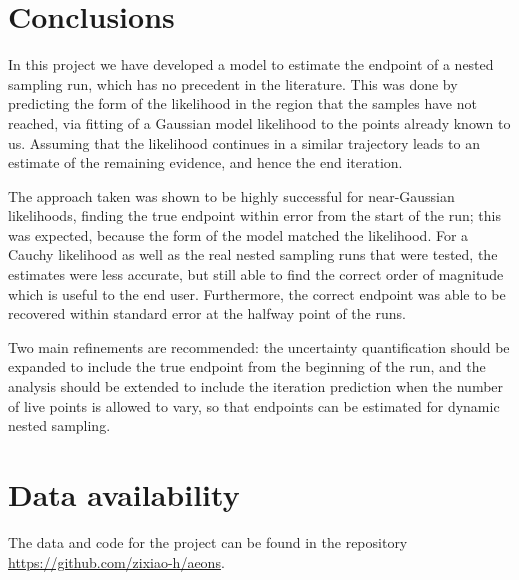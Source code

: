 \documentclass[usenatbib]{mnras}
\begin{document}
\section{Conclusions}\label{sec:Conclusions}
In this project we have developed a model to estimate the endpoint of a nested sampling run, which has no precedent in the literature. This was done by predicting the form of the likelihood in the region that the samples have not reached, via fitting of a Gaussian model likelihood to the points already known to us. Assuming that the likelihood continues in a similar trajectory leads to an estimate of the remaining evidence, and hence the end iteration.  
\par
The approach taken was shown to be highly successful for near-Gaussian likelihoods, finding the true endpoint within error from the start of the run; this was expected, because the form of the model matched the likelihood. For a Cauchy likelihood as well as the real nested sampling runs that were tested, the estimates were less accurate, but still able to find the correct order of magnitude which is useful to the end user. Furthermore, the correct endpoint was able to be recovered within standard error at the halfway point of the runs.
\par
Two main refinements are recommended: the uncertainty quantification should be expanded to include the true endpoint from the beginning of the run, and the analysis should be extended to include the iteration prediction when the number of live points is allowed to vary, so that endpoints can be estimated for dynamic nested sampling.

\section*{Data availability}
The data and code for the project can be found in the repository \url{https://github.com/zixiao-h/aeons}.





\label{lastpage}
\end{document}
